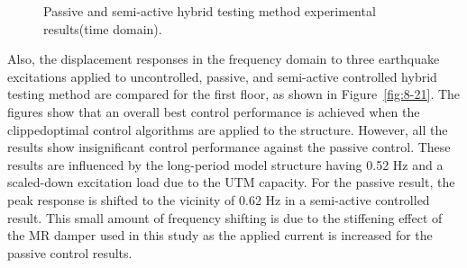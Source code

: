 \begin{figure}[H]
\centering
{}
\caption{Passive and semi-active hybrid testing method experimental results(time domain).}
\label{fig:8-20}
\end{figure}

Also, the displacement responses in the frequency domain to three earthquake excitations applied to uncontrolled, passive, and semi-active controlled hybrid testing method are compared for the first floor, as shown in Figure~\ref{fig:8-21}. The figures show that an overall best control performance is achieved when the clippedoptimal control algorithms are applied to the structure. However, all the results show insignificant control performance against the passive control. These results are influenced by the long-period model structure having 0.52 Hz and a scaled-down excitation load due to the UTM capacity. For the passive result, the peak response is shifted to the vicinity of 0.62 Hz in a semi-active controlled result. This small amount of frequency shifting is due to the stiffening effect of the MR damper used in this study as the applied current is increased for the passive control results.


